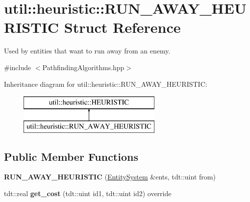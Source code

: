 \hypertarget{structutil_1_1heuristic_1_1_r_u_n___a_w_a_y___h_e_u_r_i_s_t_i_c}{}\section{util\+:\+:heuristic\+:\+:R\+U\+N\+\_\+\+A\+W\+A\+Y\+\_\+\+H\+E\+U\+R\+I\+S\+T\+IC Struct Reference}
\label{structutil_1_1heuristic_1_1_r_u_n___a_w_a_y___h_e_u_r_i_s_t_i_c}


Used by entities that want to run away from an enemy.  




{\ttfamily \#include $<$Pathfinding\+Algorithms.\+hpp$>$}

Inheritance diagram for util\+:\+:heuristic\+:\+:R\+U\+N\+\_\+\+A\+W\+A\+Y\+\_\+\+H\+E\+U\+R\+I\+S\+T\+IC\+:\begin{figure}[H]
\begin{center}
\leavevmode
\includegraphics[height=2.000000cm]{structutil_1_1heuristic_1_1_r_u_n___a_w_a_y___h_e_u_r_i_s_t_i_c}
\end{center}
\end{figure}
\subsection*{Public Member Functions}
\begin{DoxyCompactItemize}
\item 
{\bfseries R\+U\+N\+\_\+\+A\+W\+A\+Y\+\_\+\+H\+E\+U\+R\+I\+S\+T\+IC} (\hyperlink{class_entity_system}{Entity\+System} \&ents, tdt\+::uint from)\hypertarget{structutil_1_1heuristic_1_1_r_u_n___a_w_a_y___h_e_u_r_i_s_t_i_c_a2b78448b2d225def225601ac2cbb8f8c}{}\label{structutil_1_1heuristic_1_1_r_u_n___a_w_a_y___h_e_u_r_i_s_t_i_c_a2b78448b2d225def225601ac2cbb8f8c}

\item 
tdt\+::real {\bfseries get\+\_\+cost} (tdt\+::uint id1, tdt\+::uint id2) override\hypertarget{structutil_1_1heuristic_1_1_r_u_n___a_w_a_y___h_e_u_r_i_s_t_i_c_a66af6c2d26e4f1a39a8104fe26e14ebd}{}\label{structutil_1_1heuristic_1_1_r_u_n___a_w_a_y___h_e_u_r_i_s_t_i_c_a66af6c2d26e4f1a39a8104fe26e14ebd}

\end{DoxyCompactItemize}
